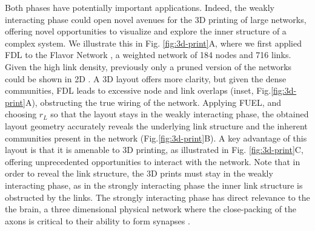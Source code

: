 \documentclass[nofootinbib,preprint,floatfix,titlepage,superscriptaddress]{revtex4} %
\begin{document}
Both phases have potentially important applications. 
Indeed, the weakly interacting phase could open novel avenues for the 3D printing of large networks, offering novel opportunities to visualize and explore the inner structure of a complex system. 
We illustrate this in Fig. \ref{fig:3d-print}A, where we first applied FDL to the Flavor Network \cite{ahn2011flavor}, a weighted network of 184 nodes and 716 links.
Given the high link density, previously only a pruned version of the networks could be shown in 2D \cite{ahn2011flavor}. 
A 3D layout offers more clarity, but %
given the dense communities, FDL leads to excessive node and link overlaps (inset, Fig.\ref{fig:3d-print}A), obstructing the true wiring of the network. 
Applying FUEL, and choosing $r_L$ so that the layout stays in the weakly interacting phase, the obtained layout geometry accurately reveals the underlying link structure and the inherent communities present in the network (Fig.\ref{fig:3d-print}B). 
A key advantage of this layout is that it is amenable to 3D printing, as illustrated in Fig. \ref{fig:3d-print}C, offering unprecedented opportunities to interact with the network.
Note that in order to reveal the link structure, the 3D prints must stay in the weakly interacting phase, as in the strongly interacting phase the inner link structure is obstructed by the links.
The strongly interacting phase has direct relevance to the the brain, a three dimensional physical network where the close-packing of the axons is critical to their ability to form synapses \cite{stepanyants2002geometry,rivera2011wiring}. 
\end{document}
